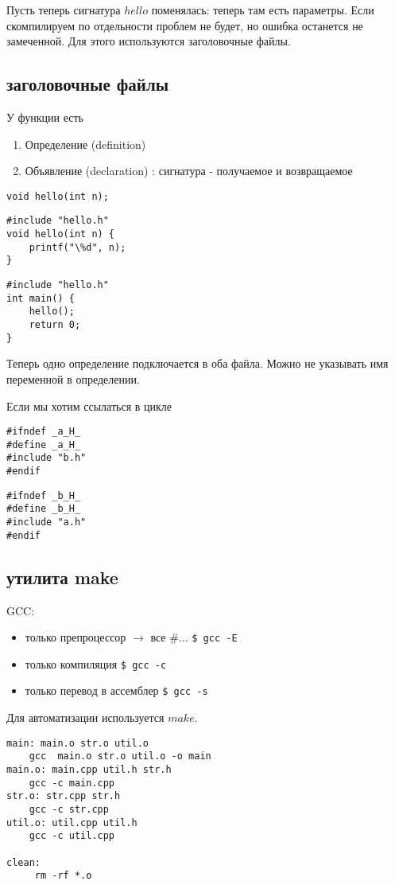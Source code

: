 Пусть теперь сигнатура  $hello$ поменялась: теперь там есть параметры. Если скомпилируем по отдельности проблем не будет, но ошибка останется не замеченной. Для этого используются заголовочные файлы.

\subsection{заголовочные файлы}
У функции есть
\begin{enumerate}[noitemsep]
    \item  Определение (definition)
    \item  Объявление (declaration) : сигнатура - получаемое и возвращаемое
\end{enumerate}

\begin{verbatim}
void hello(int n);
\end{verbatim}
\begin{verbatim}
#include "hello.h"
void hello(int n) {
    printf("\%d", n);
}
\end{verbatim}
\begin{verbatim}
#include "hello.h"
int main() {
    hello();
    return 0;
}
\end{verbatim}
Теперь одно определение подключается в оба файла. Можно не указывать имя переменной в определении.

Если  мы хотим ссылаться в цикле
\begin{verbatim}
#ifndef _a_H_
#define _a_H_
#include "b.h"
#endif
\end{verbatim}
\begin{verbatim}
#ifndef _b_H_
#define _b_H_
#include "a.h"
#endif
\end{verbatim}
\subsection{утилита make}
GCC:
\begin{itemize}[noitemsep]
    \item  только препроцессор $\to$ все $ \#\ldots $
	{\tt \$ gcc -E}
	
    \item  только компиляция
	{\tt \$ gcc -c}
    \item только перевод в ассемблер
	{\tt\$ gcc -s}
\end{itemize}
Для автоматизации используется $ make$.
\begin{verbatim}
main: main.o str.o util.o
    gcc  main.o str.o util.o -o main
main.o: main.cpp util.h str.h
    gcc -c main.cpp
str.o: str.cpp str.h
    gcc -c str.cpp
util.o: util.cpp util.h
    gcc -c util.cpp

clean:
     rm -rf *.o
\end{verbatim}

% 
